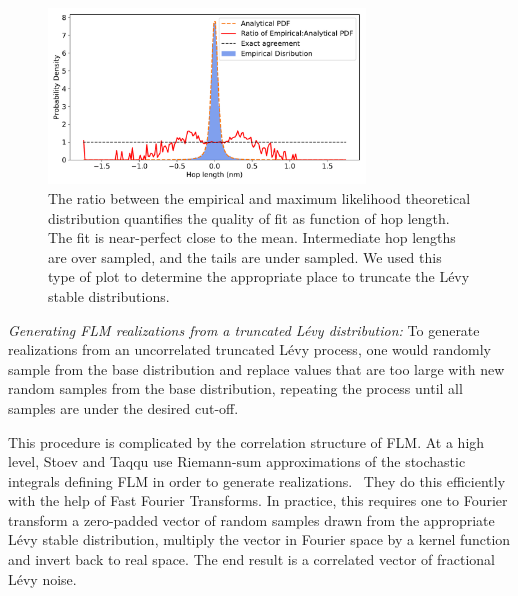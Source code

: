 \documentclass{article}
\begin{document}
  \begin{figure}
  \centering
  \includegraphics[width=0.75\textwidth]{truncation_cutoff.pdf}
  \caption{The ratio between the empirical and maximum likelihood theoretical
  distribution quantifies the quality of fit as function of hop length. The fit
  is near-perfect close to the mean. Intermediate hop lengths are over sampled, 
  and the tails are under sampled. We used this type of plot to determine the
  appropriate place to truncate the L\'evy stable distributions.}\label{fig:truncation_cutoff}
  \end{figure}
  
  \textit{Generating FLM realizations from a truncated L\'evy distribution:}
  To generate realizations from an uncorrelated truncated L\'evy process, one would
  randomly sample from the base distribution and replace values that are too large
  with new random samples from the base distribution, repeating the process until
  all samples are under the desired cut-off. 
  
  This procedure is complicated by the correlation structure of FLM. At a high level,
  Stoev and Taqqu use Riemann-sum approximations of the stochastic integrals defining
  FLM in order to generate realizations.~\cite{stoev_simulation_2004} They do this efficiently with the help of 
  Fast Fourier Transforms. In practice, this requires one to Fourier transform a zero-padded
  vector of random samples drawn from the appropriate L\'evy stable distribution, multiply
  the vector in Fourier space by a kernel function and invert back to real space. The end
  result is a correlated vector of fractional L\'evy noise.
  
\end{document}
